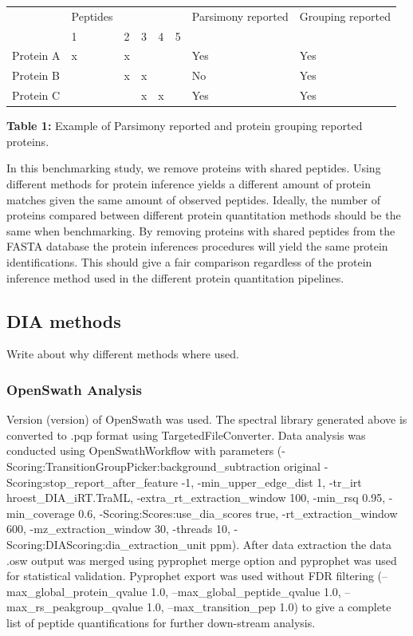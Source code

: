 \documentclass[10pt,letterpaper]{article}
\begin{document}
\begin{table}[!htbp]
\begin{tabular}{llllllll}
          & Peptides &   &   &   &   & Parsimony reported & Grouping reported \\
          & 1        & 2 & 3 & 4 & 5 &                    &                   \\
Protein A & x        & x &   &   &   & Yes                & Yes               \\
Protein B &          & x & x &   &   & No                 & Yes               \\
Protein C &          &   & x & x &   & Yes                & Yes              	
\end{tabular}
\newline
\textbf{Table 1:} Example of Parsimony reported and protein grouping reported proteins.
\end{table}

In this benchmarking study, we remove proteins with shared peptides. Using different methods for protein inference yields a different amount of protein matches given the same amount of observed peptides. Ideally, the number of proteins compared between different protein quantitation methods should be the same when benchmarking. By removing proteins with shared peptides from the FASTA database the protein inferences procedures will yield the same protein identifications. This should give a fair comparison regardless of the protein inference method used in the different protein quantitation pipelines.

\subsection*{DIA methods}
Write about why different methods where used.

\subsubsection*{OpenSwath Analysis}
Version (version) of OpenSwath was used. The spectral library generated above is converted to .pqp format using TargetedFileConverter. Data analysis was conducted using OpenSwathWorkflow with parameters (-Scoring:TransitionGroupPicker:background\_subtraction original -Scoring:stop\_report\_after\_feature -1, -min\_upper\_edge\_dist 1, -tr\_irt hroest\_DIA\_iRT.TraML, -extra\_rt\_extraction\_window 100, -min\_rsq 0.95, -min\_coverage 0.6, -Scoring:Scores:use\_dia\_scores true, -rt\_extraction\_window 600, -mz\_extraction\_window 30, -threads 10, -Scoring:DIAScoring:dia\_extraction\_unit ppm). After data extraction the data .osw output was merged using pyprophet merge option and pyprophet was used for statistical validation. Pyprophet export was used without FDR filtering (--max\_global\_protein\_qvalue 1.0, --max\_global\_peptide\_qvalue 1.0, --max\_rs\_peakgroup\_qvalue 1.0, --max\_transition\_pep 1.0) to give a complete list of peptide quantifications for further down-stream analysis.
\end{document}
